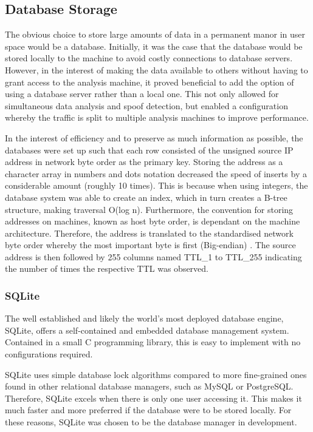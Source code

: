 \documentclass[12pt,twoside]{article}
\begin{document}
\subsection{Database Storage} \label{database}
The obvious choice to store large amounts of data in a permanent manor in user space would be a database. Initially, it was the case that the database would be stored locally to the machine to avoid costly connections to database servers. However, in the interest of making the data available to others without having to grant access to the analysis machine, it proved beneficial to add the option of using a database server rather than a local one. This not only allowed for simultaneous data analysis and spoof detection, but enabled a configuration whereby the traffic is split to multiple analysis machines to improve performance.

In the interest of efficiency and to preserve as much information as possible, the databases were set up such that each row consisted of the unsigned source IP address in network byte order as the primary key. Storing the address as a character array in numbers and dots notation decreased the speed of inserts by a considerable amount (roughly 10 times). This is because when using integers, the database system was able to create an index, which in turn creates a B-tree structure, making traversal O(log n). Furthermore, the convention for storing addresses on machines, known as host byte order, is dependant on the machine architecture. Therefore, the address is translated to the standardised network byte order whereby the most important byte is first (Big-endian) \cite{endianess}. The source address is then followed by 255 columns named TTL\_1 to TTL\_255 indicating the number of times the respective TTL was observed.

\subsubsection{SQLite \cite{sqlite}}
The well established and likely the world's most deployed database engine, SQLite, offers a self-contained and embedded database management system. Contained in a small C programming library, this is easy to implement with no configurations required.

SQLite uses simple database lock algorithms compared to more fine-grained ones found in other relational database managers, such as MySQL or PostgreSQL. Therefore, SQLite excels when there is only one user accessing it. This makes it much faster and more preferred if the database were to be stored locally. For these reasons, SQLite was chosen to be the database manager in development.
\end{document}
